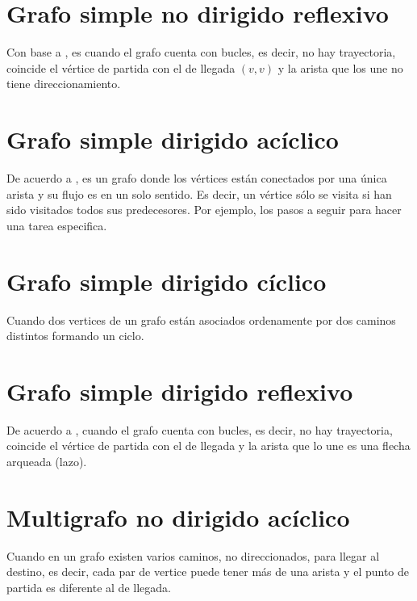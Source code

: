 \documentclass{article}
\begin{document}
\section{Grafo simple no dirigido reflexivo}
Con base a \citet{elisa, park}, es cuando el grafo cuenta con bucles, es decir, no hay trayectoria, coincide el vértice de partida con el de llegada $(v,v)$ y la arista que los une no tiene direccionamiento.


\section{Grafo simple dirigido acíclico}
De acuerdo a \citet{Ahuja2017}, es un grafo donde los vértices están conectados por una única arista y su flujo es en un solo sentido. Es decir, un vértice sólo se visita si han sido visitados todos sus predecesores. Por ejemplo, los pasos a seguir para hacer una tarea especifica.



\section{Grafo simple dirigido cíclico}
Cuando dos vertices de un grafo están asociados ordenamente por dos caminos distintos formando un ciclo.


\section{Grafo simple dirigido reflexivo}
De acuerdo a \cite{elisa}, cuando el grafo cuenta con bucles, es decir, no hay trayectoria, coincide el vértice de partida con el de llegada y la arista que lo une es una flecha arqueada (lazo).



\section{Multigrafo no dirigido acíclico}
Cuando en un grafo existen varios caminos, no direccionados, para llegar al destino, es decir, cada par de vertice puede tener más de una arista y el punto de partida es diferente al de llegada.
\end{document}
